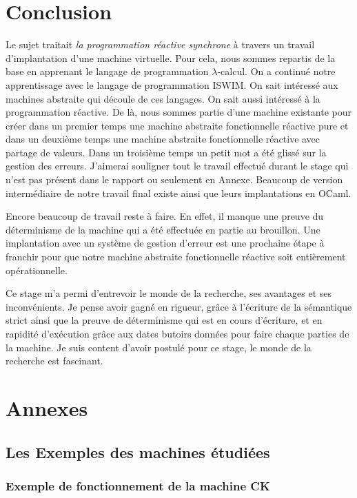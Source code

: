 \documentclass[10pt,a4paper]{report}
\begin{document}
\chapter{Conclusion}

Le sujet traitait \textit{la programmation réactive synchrone} à travers un travail d'implantation d'une machine virtuelle. Pour cela, nous sommes repartis de la base en apprenant le langage de programmation $\lambda$-calcul. On a continué notre apprentissage avec le langage de programmation ISWIM. On sait intéressé aux machines abstraite qui découle de ces langages. On sait aussi intéressé à la programmation réactive. De là, nous sommes partie d'une machine existante pour créer dans un premier temps une machine abstraite fonctionnelle réactive pure et dans un deuxième temps une machine abstraite fonctionnelle réactive avec partage de valeurs. Dans un troisième temps un petit mot a été glissé sur la gestion des erreurs. J'aimerai souligner tout le travail effectué durant le stage qui n'est pas présent dans le rapport ou seulement en Annexe. Beaucoup de version intermédiaire de notre travail final existe ainsi que leurs implantations en OCaml. 
\medbreak

Encore beaucoup de travail reste à faire. En effet, il manque une preuve du déterminisme de la machine qui a été effectuée en partie au brouillon. Une implantation avec un système de gestion d'erreur est une prochaine étape à franchir pour que notre machine abstraite fonctionnelle réactive soit entièrement opérationnelle.
\medbreak

Ce stage m'a permi d'entrevoir le monde de la recherche, ses avantages et ses inconvénients. Je pense avoir gagné en rigueur, grâce à l'écriture de la sémantique strict ainsi que la preuve de déterminisme qui est en cours d'écriture, et en rapidité d'exécution grâce aux dates butoirs données pour faire chaque parties de la machine. Je suis content d'avoir postulé pour ce stage, le monde de la recherche est fascinant.




\chapter*{Annexes}

\section{Les Exemples des machines étudiées}

\subsection{Exemple de fonctionnement de la machine CK}\label{CK}
\end{document}
